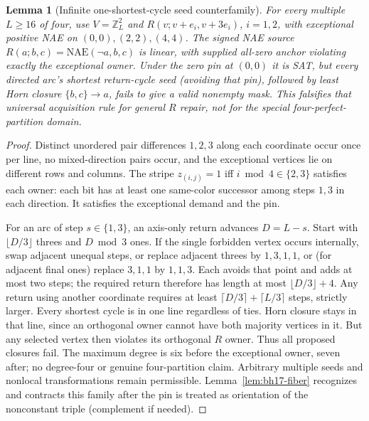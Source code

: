\documentclass[11pt]{article}
\newtheorem{lemma}[theorem]{Lemma}
\begin{document}
\begin{lemma}[Infinite one-shortest-cycle seed counterfamily]\label{lem:bh17-torus}
For every multiple \(L\ge16\) of four, use \(V=\mathbb Z_L^2\) and \(R(v;v+e_i,v+3e_i)\), \(i=1,2\), with exceptional positive NAE on \((0,0),(2,2),(4,4)\). The signed NAE source \(R(a;b,c)=\mathrm{NAE}(\neg a,b,c)\) is linear, with supplied all-zero anchor violating exactly the exceptional owner. Under the zero pin at \((0,0)\) it is SAT, but every directed arc's shortest return-cycle seed (avoiding that pin), followed by least Horn closure \(\{b,c\}\to a\), fails to give a valid nonempty mask. This falsifies that universal acquisition rule for general \(R\) repair, not for the special four-perfect-partition domain.
\end{lemma}
\begin{proof}
Distinct unordered pair differences \(1,2,3\) along each coordinate occur once per line, no mixed-direction pairs occur, and the exceptional vertices lie on different rows and columns. The stripe \(z_{(i,j)}=1\) iff \(i\bmod4\in\{2,3\}\) satisfies each owner: each bit has at least one same-color successor among steps \(1,3\) in each direction. It satisfies the exceptional demand and the pin.

For an arc of step \(s\in\{1,3\}\), an axis-only return advances \(D=L-s\). Start with \(\lfloor D/3\rfloor\) threes and \(D\bmod3\) ones. If the single forbidden vertex occurs internally, swap adjacent unequal steps, or replace adjacent threes by \(1,3,1,1\), or (for adjacent final ones) replace \(3,1,1\) by \(1,1,3\). Each avoids that point and adds at most two steps; the required return therefore has length at most \(\lfloor D/3\rfloor+4\). Any return using another coordinate requires at least \(\lceil D/3\rceil+\lceil L/3\rceil\) steps, strictly larger. Every shortest cycle is in one line regardless of ties. Horn closure stays in that line, since an orthogonal owner cannot have both majority vertices in it. But any selected vertex then violates its orthogonal \(R\) owner. Thus all proposed closures fail. The maximum degree is six before the exceptional owner, seven after; no degree-four or genuine four-partition claim. Arbitrary multiple seeds and nonlocal transformations remain permissible. Lemma~\ref{lem:bh17-fiber} recognizes and contracts this family after the pin is treated as orientation of the nonconstant triple (complement if needed).
\end{proof}
\end{document}
